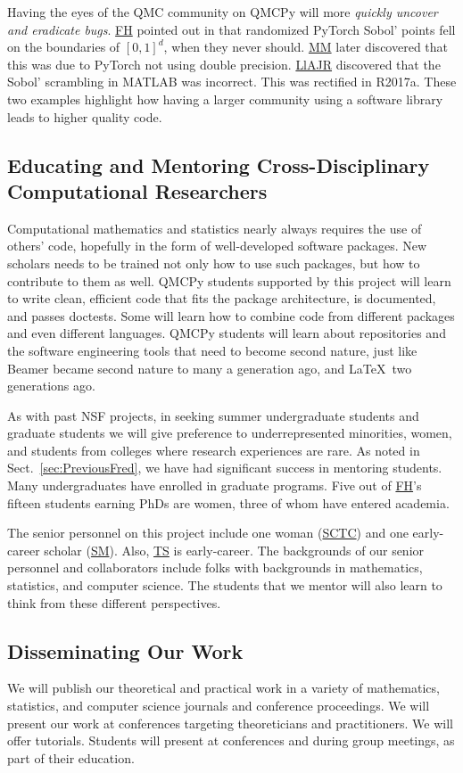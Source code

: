 \documentclass[11pt]{NSFamsart}
\newcommand{\FH}{\hyperlink{FHlink}{FH}\xspace}
\newcommand{\SM}{\hyperlink{SMlink}{SM}\xspace}
\newcommand{\SCTC}{\hyperlink{SCTClink}{SCTC}\xspace}
\newcommand{\MM}{\hyperlink{MMlink}{MM}\xspace}
\newcommand{\TS}{\hyperlink{TSlink}{TS}\xspace}
\newcommand{\LlAJR}{\hyperlink{LlAJRlink}{LlAJR}\xspace}
\begin{document}
Having the eyes of the QMC community on QMCPy will more \emph{quickly uncover and eradicate bugs}.  \FH  pointed out in \cite{PyTorchFirstPt2020a} that randomized PyTorch Sobol' points fell on the boundaries of $[0,1]^d$, when they never should.  \MM later discovered that this was due to PyTorch not using double precision.  \LlAJR discovered that the  Sobol' scrambling in MATLAB was incorrect.  This was rectified in R2017a.  These two examples highlight how having a larger community using a software library leads to higher quality code.

\subsection{Educating and Mentoring Cross-Disciplinary Computational Researchers}
Computational mathematics and statistics nearly always requires the use of others' code, hopefully in the form of well-developed software packages.  New scholars needs to be trained not only how to use such packages, but how to contribute to them as well.  QMCPy students supported by this project will learn to write clean, efficient code that fits the package architecture, is documented, and passes doctests.  Some will learn how to combine code from different packages and even different languages.  QMCPy students will learn about repositories and the software engineering tools that need to become second nature, just like Beamer became second nature to many a generation ago, and \LaTeX\ two generations ago.

As with past NSF projects, in seeking summer undergraduate students and graduate students we will give preference to underrepresented minorities, women, and students from colleges where research experiences are rare.  As noted in Sect.\ \ref{sec:PreviousFred}, we have had significant success in mentoring students.  Many undergraduates have enrolled in graduate programs.  Five out of \FH's fifteen students earning PhDs are women, three of whom have entered academia.

The senior personnel on this project include one woman (\SCTC) and one early-career scholar (\SM).  Also, \TS is early-career.  The backgrounds of our senior personnel and collaborators include folks with backgrounds in mathematics, statistics, and computer science.  The students  that we mentor will also learn to think from these different perspectives.

\subsection{Disseminating Our Work} We will publish our theoretical and practical work in a variety of mathematics, statistics, and computer science journals and conference proceedings. We will present our work at conferences targeting theoreticians and practitioners.  We will offer tutorials.  Students will present at conferences and during group meetings, as part of their education.
\end{document}
